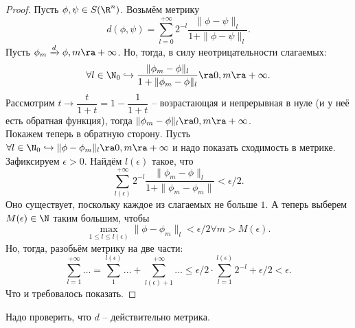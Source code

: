 \begin{proof}
    Пусть $\phi, \psi \in S(\R^n)$.
    Возьмём метрику
    \[
        d(\phi, \psi) = \sum\limits_{l = 0}^{+\infty} 2^{-l} \dfrac{\|\phi - \psi\|_l}{1 + \|\phi - \psi\|_l}.
    \]
    Пусть $\phi_m \xrightarrow{d} \phi, m \ra +\infty$.
    Но, тогда, в силу неотрицательности слагаемых:
    \[
        \forall l \in \N_{0} \hookrightarrow \dfrac{\|\phi_m - \phi\|_l}{1 + \|\phi_m - \phi\|_l} \ra 0, m \ra +\infty.
    \]
    Рассмотрим $t \to \dfrac{t}{1 + t} = 1 - \dfrac{1}{1 + t}$ -- возрастающая и непрерывная в нуле (и у неё есть обратная функция),
    тогда $\|\phi_m - \phi\|_l \ra 0, m \ra +\infty$. \\
    Покажем теперь в обратную сторону.
    Пусть $\forall l \in \N_0 \hookrightarrow \|\phi - \phi_m\|_l \ra 0, m \ra +\infty$ и надо показать сходимость в метрике.
    Зафиксируем $\epsilon > 0$.
    Найдём $l(\epsilon)$ такое, что
    \[
        \sum\limits_{l(\epsilon)}^{+\infty} 2^{-l} \dfrac{\|\phi_m - \phi\|_l}{1 + \|\phi_m - \phi_m\|} < \epsilon/2.
    \]
    Оно существует, поскольку каждое из слагаемых не больше $1$.
    А теперь выберем $M(\epsilon) \in \N$ таким большим, чтобы
    \[
        \max\limits_{1 \leq l \leq l(\epsilon)} \|\phi - \phi_m\|_l < \epsilon/2 \forall m > M(\epsilon).
    \]
    Но, тогда, разобьём метрику на две части:
    \[
        \sum\limits_{l = 1}^{+\infty} \ldots = \sum\limits_{1}^{l(\epsilon)} \ldots + \sum\limits_{l(\epsilon) + 1}^{+\infty} \ldots \leq \epsilon/2 \cdot\sum\limits_{l = 1}^{l(\epsilon)} 2^{-l} + \epsilon/2 < \epsilon.
    \]
    Что и требовалось показать.
\end{proof}


\begin{note}
    Надо проверить, что $d$ -- действительно метрика.
\end{note}

